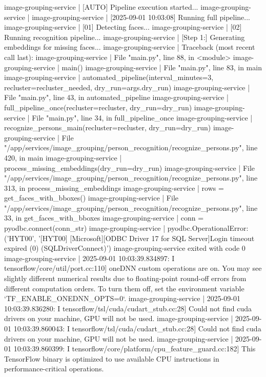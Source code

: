 image-grouping-service  | [AUTO] Pipeline execution started...
image-grouping-service  |
image-grouping-service  | [2025-09-01 10:03:08] Running full pipeline...
image-grouping-service  | [01] Detecting faces...
image-grouping-service  | [02] Running recognition pipeline...
image-grouping-service  | [Step 1:] Generating embeddings for missing faces...
image-grouping-service  | Traceback (most recent call last):
image-grouping-service  |   File "main.py", line 88, in <module>
image-grouping-service  |     main()
image-grouping-service  |   File "main.py", line 83, in main
image-grouping-service  |     automated_pipeline(interval_minutes=3, recluster=recluster_needed, dry_run=args.dry_run)
image-grouping-service  |   File "main.py", line 43, in automated_pipeline
image-grouping-service  |     full_pipeline_once(recluster=recluster, dry_run=dry_run)
image-grouping-service  |   File "main.py", line 34, in full_pipeline_once
image-grouping-service  |     recognize_persons_main(recluster=recluster, dry_run=dry_run)
image-grouping-service  |   File "/app/services/image_grouping/person_recognition/recognize_persons.py", line 420, in main
image-grouping-service  |     process_missing_embeddings(dry_run=dry_run)
image-grouping-service  |   File "/app/services/image_grouping/person_recognition/recognize_persons.py", line 313, in process_missing_embeddings
image-grouping-service  |     rows = get_faces_with_bboxes()
image-grouping-service  |   File "/app/services/image_grouping/person_recognition/recognize_persons.py", line 33, in get_faces_with_bboxes
image-grouping-service  |     conn = pyodbc.connect(conn_str)
image-grouping-service  | pyodbc.OperationalError: ('HYT00', '[HYT00] [Microsoft][ODBC Driver 17 for SQL Server]Login timeout expired (0) (SQLDriverConnect)')
image-grouping-service exited with code 0
image-grouping-service  | 2025-09-01 10:03:39.834897: I tensorflow/core/util/port.cc:110] oneDNN custom operations are on. You may see slightly different numerical results due to floating-point round-off errors from different computation orders. To turn them off, set the environment variable `TF_ENABLE_ONEDNN_OPTS=0`.
image-grouping-service  | 2025-09-01 10:03:39.836280: I tensorflow/tsl/cuda/cudart_stub.cc:28] Could not find cuda drivers on your machine, GPU will not be used.
image-grouping-service  | 2025-09-01 10:03:39.860043: I tensorflow/tsl/cuda/cudart_stub.cc:28] Could not find cuda drivers on your machine, GPU will not be used.
image-grouping-service  | 2025-09-01 10:03:39.860399: I tensorflow/core/platform/cpu_feature_guard.cc:182] This TensorFlow binary is optimized to use available CPU instructions in performance-critical operations.
